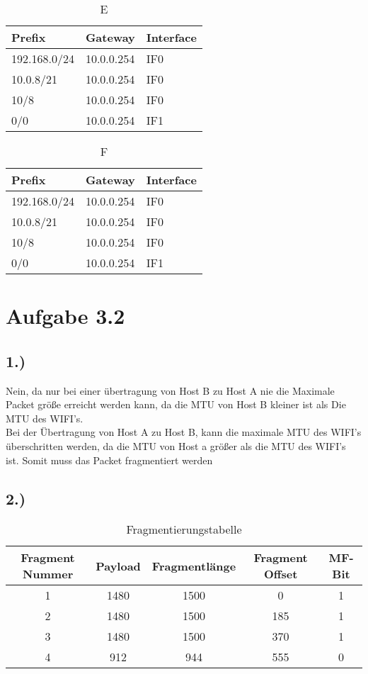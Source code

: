 \documentclass[a4paper]{scrartcl}
\begin{document}
\begin{table}[]
\centering
\caption{E}
\label{tab:my-table}
\begin{tabular}{|l|l|l|}
\hline
Prefix       & Gateway    & Interface \\ \hline
192.168.0/24 & 10.0.0.254 & IF0       \\ \hline
10.0.8/21    & 10.0.0.254 & IF0       \\ \hline
10/8         & 10.0.0.254 & IF0       \\ \hline
0/0          & 10.0.0.254 & IF1       \\ \hline
\end{tabular}
\end{table}

\begin{table}[]
\centering
\caption{F}
\label{tab:my-table}
\begin{tabular}{|l|l|l|}
\hline
Prefix       & Gateway    & Interface \\ \hline
192.168.0/24 & 10.0.0.254 & IF0       \\ \hline
10.0.8/21    & 10.0.0.254 & IF0       \\ \hline
10/8         & 10.0.0.254 & IF0       \\ \hline
0/0          & 10.0.0.254 & IF1       \\ \hline
\end{tabular}
\end{table}
\newpage
\section*{Aufgabe 3.2}
\subsection*{1.)}
Nein, da nur bei einer übertragung von Host B zu Host A nie die Maximale Packet größe erreicht werden kann, da die MTU von Host B kleiner ist als Die MTU des WIFI's. \\
Bei der Übertragung von Host A zu Host B, kann die maximale MTU des WIFI's überschritten werden, da die MTU von Host a größer als die MTU des WIFI's ist. Somit muss das Packet fragmentiert werden
\subsection*{2.)}
\begin{table}[htbp]
\centering
\caption{Fragmentierungstabelle}
\begin{tabular}{|c|c|c|c|c|}
    \hline
    \textbf{Fragment Nummer} & \textbf{Payload} & \textbf{Fragmentlänge} & \textbf{Fragment Offset} & \textbf{MF-Bit} \\
    \hline
    1 & 1480 & 1500 & 0 & 1 \\
    2 & 1480 & 1500 & 185 & 1 \\
    3 & 1480 & 1500 & 370 & 1 \\
    4 & 912 & 944 & 555 & 0 \\
    \hline
\end{tabular}
\label{tab:fragmentierung}
\end{table}
\end{document}
